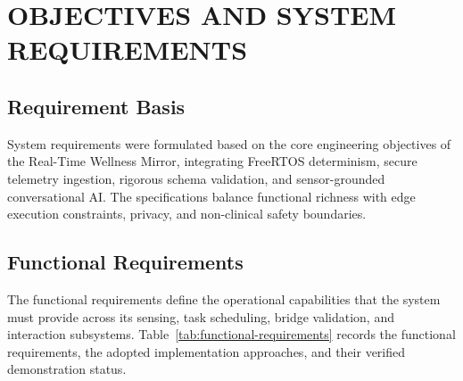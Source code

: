 \chapter{OBJECTIVES AND SYSTEM REQUIREMENTS}

\section{Requirement Basis}
System requirements were formulated based on the core engineering objectives of the Real-Time Wellness Mirror, integrating FreeRTOS determinism, secure telemetry ingestion, rigorous schema validation, and sensor-grounded conversational AI. The specifications balance functional richness with edge execution constraints, privacy, and non-clinical safety boundaries.

\section{Functional Requirements}
The functional requirements define the operational capabilities that the system must provide across its sensing, task scheduling, bridge validation, and interaction subsystems. Table~\ref{tab:functional-requirements} records the functional requirements, the adopted implementation approaches, and their verified demonstration status.

